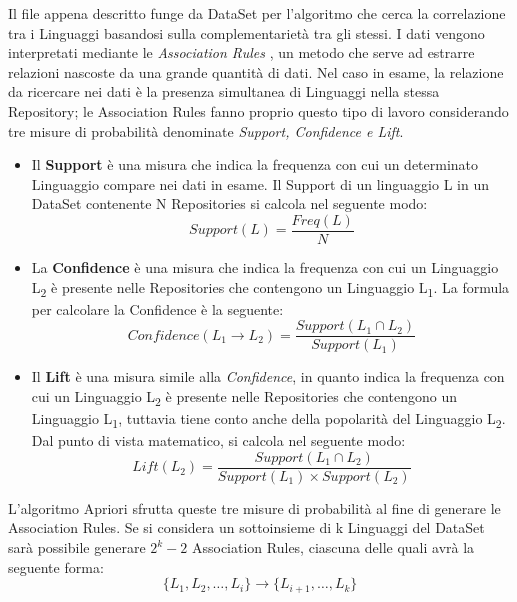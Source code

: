 Il file appena descritto funge da DataSet per l'algoritmo che cerca la correlazione tra i Linguaggi basandosi sulla complementarietà tra gli stessi. 
I dati vengono interpretati mediante le \emph{Association Rules} \cite{AssociationRules}, un metodo che serve ad estrarre relazioni nascoste da una grande quantità di dati. Nel caso in esame, la relazione da ricercare nei dati è la presenza simultanea di Linguaggi nella stessa Repository; le Association Rules fanno proprio questo tipo di lavoro considerando tre misure di probabilità denominate \emph{Support, Confidence e Lift}.
\begin{itemize}
    \item Il \textbf{Support} è una misura che indica la frequenza con cui un determinato Linguaggio compare nei dati in esame. Il Support di un linguaggio L in un DataSet contenente N Repositories si calcola nel seguente modo: 
        \begin{equation}    
            Support(L)=\frac{Freq(L)}{N}
        \end{equation}    
    \item La \textbf{Confidence} è una misura che indica la frequenza con cui un Linguaggio L\textsubscript2 è presente nelle Repositories che contengono un Linguaggio L\textsubscript1. La formula per calcolare la Confidence è la seguente:
        \begin{equation}
            Confidence(L_1 \rightarrow L_2)=\frac{Support(L_1 \cap L_2)}{Support(L_1)}
        \end{equation}
    \item Il \textbf{Lift} è una misura simile alla \emph{Confidence}, in quanto indica la frequenza con cui un Linguaggio L\textsubscript2 è presente nelle Repositories che contengono un Linguaggio L\textsubscript1, tuttavia tiene conto anche della popolarità del Linguaggio L\textsubscript2. Dal punto di vista matematico, si calcola nel seguente modo:
        \begin{equation}
            Lift(L_2)=\frac{Support(L_1 \cap L_2)}{Support(L_1) \times Support(L_2)}
        \end{equation}
\end{itemize}
L'algoritmo Apriori sfrutta queste tre misure di probabilità al fine di generare le Association Rules. Se si considera un sottoinsieme di k Linguaggi del DataSet sarà possibile generare $2^k-2$ Association Rules, ciascuna delle quali avrà la seguente forma:
\begin{equation}
    \{L_1, L_2, \dots, L_i\} \rightarrow \{L_{i+1}, \dots, L_k\}
\end{equation}
